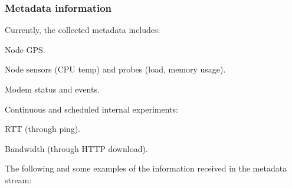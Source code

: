 \documentclass[a4paper,10pt]{article}
\begin{document}
\subsubsection{Metadata information}

Currently, the collected metadata includes:
\begin{itemize*}
	\item Node GPS.
	\item Node sensors (CPU temp) and probes (load, memory usage).
	\item Modem status and events.
	\item Continuous and scheduled internal experiments:
	\begin{itemize*}
		\item RTT (through ping).
		\item Bandwidth (through HTTP download).
	\end{itemize*}
\end{itemize*}

The following and some examples of the information received in the metadata stream:
\end{document}
